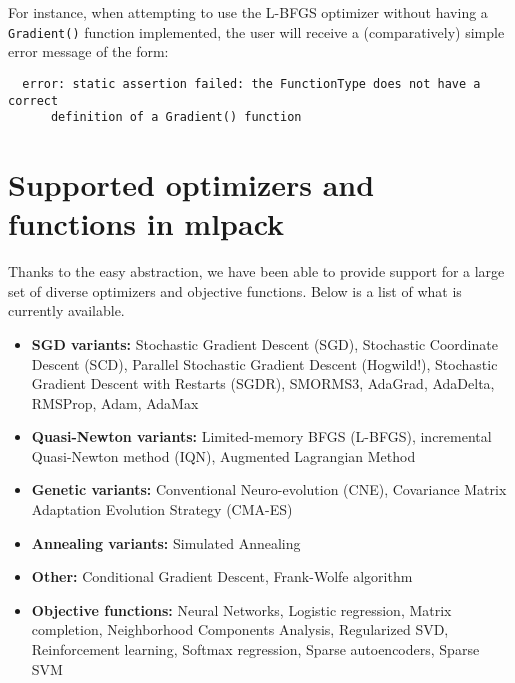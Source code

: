 \documentclass{article}
\begin{document}
For instance, when attempting to use the L-BFGS optimizer without having a
{\tt Gradient()} function implemented, the user will receive a (comparatively)
simple error message of the form:

\vspace*{-0.4em}
{\footnotesize
\begin{verbatim}
  error: static assertion failed: the FunctionType does not have a correct
      definition of a Gradient() function
\end{verbatim}
}
\vspace*{-0.9em}

\section{Supported optimizers and functions in mlpack}
\vspace*{-0.3em}

Thanks to the easy abstraction, we have been able to provide support for a large
set of diverse optimizers and objective functions.  Below is a list of what is
currently available.

\vspace*{-0.4em}
\begin{itemize} \itemsep -1pt
  \item {\bf SGD variants:} Stochastic Gradient Descent (SGD), Stochastic
      Coordinate Descent (SCD), Parallel Stochastic Gradient Descent (Hogwild!),
      Stochastic Gradient Descent with Restarts (SGDR), SMORMS3, AdaGrad,
      AdaDelta, RMSProp, Adam, AdaMax

  \item {\bf Quasi-Newton variants:} Limited-memory BFGS (L-BFGS), incremental
        Quasi-Newton method (IQN), Augmented Lagrangian Method

  \item {\bf Genetic variants:} Conventional Neuro-evolution (CNE), Covariance
        Matrix Adaptation Evolution Strategy (CMA-ES)

  \item {\bf Annealing variants:} Simulated Annealing

  \item {\bf Other:} Conditional Gradient Descent, Frank-Wolfe algorithm

  \item {\bf Objective functions:} Neural Networks, Logistic regression,
      Matrix completion, Neighborhood Components Analysis, Regularized SVD,
      Reinforcement learning, Softmax regression, Sparse autoencoders,
      Sparse SVM
\end{itemize}
\vspace*{-0.4em}
\end{document}
